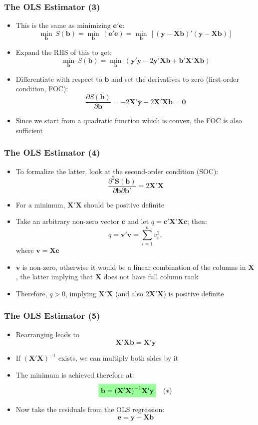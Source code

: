 \documentclass[10pt]{beamer}
\theoremstyle{definition}
\begin{document}
\begin{frame}[fragile]
\frametitle{The OLS Estimator (3)}
\begin{itemize}
	\label{mainslide}
	\item This is the same as minimizing $\mathbf{e'e}$:
	\[
		\underset{\mathbf{b}}{\min}\,S(\mathbf{b}) = \underset{\mathbf{b}}{\min}\,(\mathbf{e'e}) = \underset{\mathbf{b}}{\min}\,[(\mathbf{y - Xb})'(\mathbf{y - Xb})]
	\]
	\item Expand the RHS of this to get: \hyperlink{deriv}{}
	\[
		\underset{\mathbf{b}}{\min}\,S(\mathbf{b}) = \underset{\mathbf{b}}{\min}\,(\mathbf{y'y} - 2\mathbf{y'Xb + b'X'Xb})
	\]
	\item Differentiate with respect to $\mathbf{b}$ and set the derivatives to zero (first-order condition, FOC):
	\[
		\frac{\partial S(\mathbf{b})}{\partial\mathbf{b}} = -2\mathbf{X'y} + 2\mathbf{X'Xb} = \mathbf{0}
	\]
	\item Since we start from a quadratic function which is convex, the FOC is also sufficient
\end{itemize}
\end{frame}

\begin{frame}[fragile]
\frametitle{The OLS Estimator (4)}
\begin{itemize}
	\item To formalize the latter, look at the second-order condition (SOC):
	\[
		\dfrac{\partial^{2}\mathbf{S(b)}}{\partial \mathbf{b}\partial \mathbf{b}'} = 2\mathbf{X'X}
	\]
	\item For a minimum, $\mathbf{X'X}$ should be positive definite
	\item Take an arbitrary non-zero vector $\mathbf{c}$ and let $q = \mathbf{c'X'Xc}$; then:
	\[
		q = \mathbf{v'v} = \sum_{i=1}^{n}v_{i}^{2},
	\]
	where $\mathbf{v = Xc}$
	\item $\mathbf{v}$ is non-zero, otherwise it would be a linear combination of the columns in $\mathbf{X}$, the latter implying that $\mathbf{X}$ does not have full column rank
	\item Therefore, $q > 0$, implying $\mathbf{X'X}$ (and also $2\mathbf{X'X}$) is positive definite
\end{itemize}
\end{frame}

\begin{frame}[fragile]
\frametitle{The OLS Estimator (5)}
\begin{itemize}
	\item Rearranging leads to 
	\[
		\mathbf{X'Xb} = \mathbf{X'y}
	\]
	\item If $\mathbf{(X'X)}^{-1}$ exists, we can multiply both sides by it
	\item The minimum is achieved therefore at:
	\[
		\tikz[baseline]{
            \node[fill=green!40,anchor=base] (t1)
            {$ \mathbf{b} = \mathbf{(X'X)}^{-1}\mathbf{X'y}$};
        }\quad (*)
	\] 
	\item Now take the residuals from the OLS regression:
	\[
		\mathbf{e} = \mathbf{y - Xb}
	\]
\end{itemize}
\end{frame}
\end{document}
